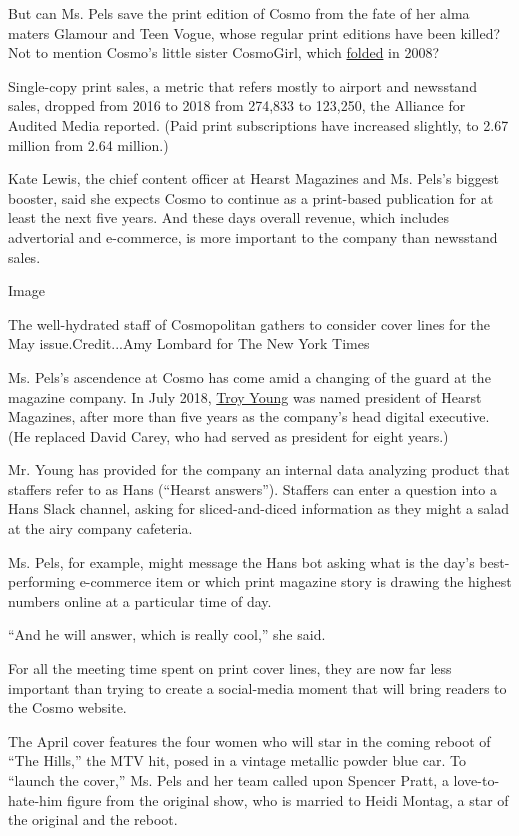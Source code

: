 But can Ms. Pels save the print edition of Cosmo from the fate of her
alma maters Glamour and Teen Vogue, whose regular print editions have
been killed? Not to mention Cosmo's little sister CosmoGirl, which
\href{https://wwd.com/business-news/media/cosmogirl-to-close-1832842/}{folded}
in 2008?

Single-copy print sales, a metric that refers mostly to airport and
newsstand sales, dropped from 2016 to 2018 from 274,833 to 123,250, the
Alliance for Audited Media reported. (Paid print subscriptions have
increased slightly, to 2.67 million from 2.64 million.)

Kate Lewis, the chief content officer at Hearst Magazines and Ms. Pels's
biggest booster, said she expects Cosmo to continue as a print-based
publication for at least the next five years. And these days overall
revenue, which includes advertorial and e-commerce, is more important to
the company than newsstand sales.

Image

The well-hydrated staff of Cosmopolitan gathers to consider cover lines
for the May issue.Credit...Amy Lombard for The New York Times

Ms. Pels's ascendence at Cosmo has come amid a changing of the guard at
the magazine company. In July 2018,
\href{https://www.nytimes3xbfgragh.onion/2020/07/22/business/media/hearst-harassment-troy-young.html}{Troy
Young} was named president of Hearst Magazines, after more than five
years as the company's head digital executive. (He replaced David Carey,
who had served as president for eight years.)

Mr. Young has provided for the company an internal data analyzing
product that staffers refer to as Hans (``Hearst answers''). Staffers
can enter a question into a Hans Slack channel, asking for
sliced-and-diced information as they might a salad at the airy company
cafeteria.

Ms. Pels, for example, might message the Hans bot asking what is the
day's best-performing e-commerce item or which print magazine story is
drawing the highest numbers online at a particular time of day.

``And he will answer, which is really cool,'' she said.

For all the meeting time spent on print cover lines, they are now far
less important than trying to create a social-media moment that will
bring readers to the Cosmo website.

The April cover features the four women who will star in the coming
reboot of ``The Hills,'' the MTV hit, posed in a vintage metallic powder
blue car. To ``launch the cover,'' Ms. Pels and her team called upon
Spencer Pratt, a love-to-hate-him figure from the original show, who is
married to Heidi Montag, a star of the original and the reboot.


